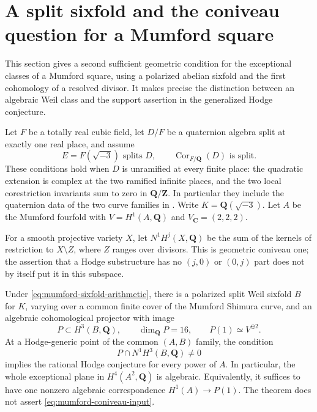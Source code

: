 \section{A split sixfold and the coniveau question for a Mumford square}
\label{sec:mumford-coniveau}

This section gives a second sufficient geometric condition for the
exceptional classes of a Mumford square, using a polarized abelian
sixfold and the first cohomology of a resolved divisor.
It makes precise the distinction between an algebraic Weil class and
the support assertion in the generalized Hodge conjecture.

Let $F$ be a totally real cubic field, let $D/F$ be a quaternion algebra
split at exactly one real place, and assume
\begin{equation}
 E=F(\sqrt{-3})\text{ splits }D,
 \qquad \operatorname{Cor}_{F/\mathbf Q}(D)\text{ is split}.
 \label{eq:mumford-sixfold-arithmetic}
\end{equation}
These conditions hold when $D$ is unramified at every finite place:
the quadratic extension is complex at the two ramified infinite places,
and the two local corestriction invariants sum to zero in
$\mathbf Q/\mathbf Z$.  In particular they include the quaternion
data of the two curve families in \cite[Theorem~1.2]{BHPS}.
Write $K=\mathbf Q(\sqrt{-3})$.  Let $A$ be the Mumford fourfold
with $V=H^1(A,\mathbf Q)$ and $V_{\mathbf C}=(2,2,2)$.

For a smooth projective variety $X$, let $N^1H^j(X,\mathbf Q)$ be the
sum of the kernels of restriction to $X\setminus Z$, where $Z$ ranges
over divisors.  This is geometric coniveau one; the assertion that a
Hodge substructure has no $(j,0)$ or $(0,j)$ part does not by itself
put it in this subspace.

\begin{theorem}\label{thm:mumford-coniveau}
Under \eqref{eq:mumford-sixfold-arithmetic}, there is a polarized split
Weil sixfold $B$ for $K$, varying over a common finite cover of the
Mumford Shimura curve, and an algebraic cohomological projector with
image
\[
 P\subset H^3(B,\mathbf Q),\qquad \dim_{\mathbf Q}P=16,
 \qquad P(1)\simeq V^{\oplus2}.
\]
At a Hodge-generic point of the common $(A,B)$ family, the condition
\begin{equation}
 P\cap N^1H^3(B,\mathbf Q)\ne0
 \label{eq:mumford-coniveau-input}
\end{equation}
implies the rational Hodge conjecture for every power of $A$.
In particular, the whole exceptional plane in $H^4(A^2,\mathbf Q)$ is
algebraic.  Equivalently, it suffices to have one nonzero algebraic
correspondence $H^1(A)\longrightarrow P(1)$.
The theorem does not assert \eqref{eq:mumford-coniveau-input}.
\end{theorem}

